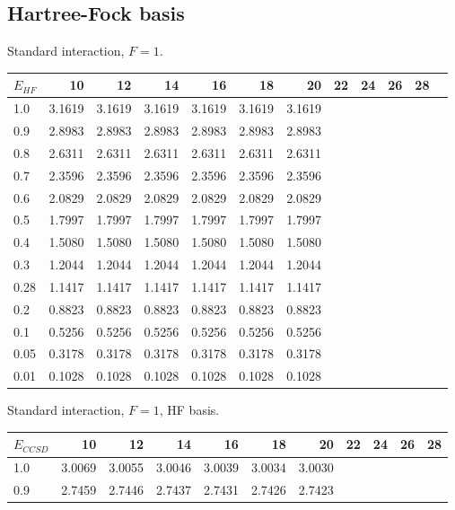 \FloatBarrier
\subsection{Hartree-Fock basis}
\FloatBarrier
\begin{landscape}
\begin{table}
\begin{center}
Standard interaction, $F=1$.\\
\begin{tabular}{l|rrrrrrrrrrr}
\hline 
$E_{HF}$ & 10 & 12 & 14 & 16 & 18 & 20 & 22 & 24 & 26 & 28 \\ 
\hline \hline
1.0 & 3.1619 & 3.1619 & 3.1619 & 3.1619 & 3.1619 & 3.1619  \\ 
0.9 & 2.8983 & 2.8983 & 2.8983 & 2.8983 & 2.8983 & 2.8983  \\ 
0.8 & 2.6311 & 2.6311 & 2.6311 & 2.6311 & 2.6311 & 2.6311  \\ 
0.7 & 2.3596 & 2.3596 & 2.3596 & 2.3596 & 2.3596 & 2.3596  \\ 
0.6 & 2.0829 & 2.0829 & 2.0829 & 2.0829 & 2.0829 & 2.0829  \\ 
0.5 & 1.7997 & 1.7997 & 1.7997 & 1.7997 & 1.7997 & 1.7997  \\ 
0.4 & 1.5080 & 1.5080 & 1.5080 & 1.5080 & 1.5080 & 1.5080  \\ 
0.3 & 1.2044 & 1.2044 & 1.2044 & 1.2044 & 1.2044 & 1.2044  \\ 
0.28 & 1.1417 & 1.1417 & 1.1417 & 1.1417 & 1.1417 & 1.1417  \\ 
0.2 & 0.8823 & 0.8823 & 0.8823 & 0.8823 & 0.8823 & 0.8823  \\ 
0.1 & 0.5256 & 0.5256 & 0.5256 & 0.5256 & 0.5256 & 0.5256  \\ 
0.05 & 0.3178 & 0.3178 & 0.3178 & 0.3178 & 0.3178 & 0.3178  \\ 
0.01 & 0.1028 & 0.1028 & 0.1028 & 0.1028 & 0.1028 & 0.1028  \\ 
\hline \hline
\end{tabular} 
\end{center}
\begin{center}
Standard interaction, $F=1$, HF basis.\\
\begin{tabular}{l|rrrrrrrrrr}
\hline 
$E_{CCSD}$ & 10 & 12 & 14 & 16 & 18 & 20 & 22 & 24 & 26 & 28 \\
\hline \hline
1.0 & 3.0069 & 3.0055 & 3.0046 & 3.0039 & 3.0034 & 3.0030  \\ 
0.9 & 2.7459 & 2.7446 & 2.7437 & 2.7431 & 2.7426 & 2.7423  \\ 

\end{tabular}
\end{center}
\end{table}
\end{landscape}
